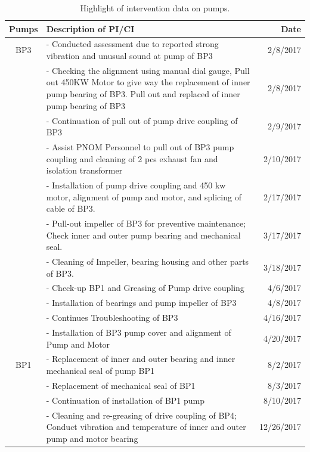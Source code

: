\begin{table}[h]
	\caption{Highlight of intervention data on pumps.}
	\label{interventiondata}
	{\footnotesize
		\begin{tabular}{c|p{8cm}|r}
			\hline
			Pumps & Description of PI/CI & Date \\ 
\hline
BP3 & - Conducted assessment due to reported strong vibration and unusual sound at pump of BP3 & 2/8/2017 \\ 
& - Checking the alignment using manual dial gauge, Pull out 450KW Motor to give way the replacement of inner pump bearing of BP3. Pull out and replaced of inner pump bearing of BP3 & 2/8/2017 \\ 
& - Continuation of pull out of pump drive coupling of BP3 & 2/9/2017 \\ 
& - Assist PNOM Personnel to pull out of BP3 pump coupling and cleaning of 2 pcs exhaust fan and isolation transformer & 2/10/2017 \\ 
& - Installation of pump drive coupling and 450 kw motor, alignment of pump and motor, and splicing of cable of BP3. & 2/17/2017 \\ 
& - Pull-out impeller of BP3 for preventive maintenance; Check inner and outer pump bearing and mechanical seal. & 3/17/2017 \\ 
& - Cleaning of Impeller, bearing housing and other parts of BP3. & 3/18/2017 \\ 
& - Check-up BP1 and Greasing of Pump drive coupling & 4/6/2017 \\ 
& - Installation of bearings and pump impeller of BP3 & 4/8/2017 \\ 
& - Continues Troubleshooting of BP3 & 4/16/2017 \\ 
& - Installation of BP3 pump cover and alignment of Pump and Motor & 4/20/2017 \\ 
\hline
BP1 & - Replacement of inner and outer bearing and inner mechanical seal of pump BP1 & 8/2/2017 \\ 
& - Replacement of mechanical seal of BP1 & 8/3/2017 \\ 
& - Continuation of installation of BP1 pump & 8/10/2017 \\ 
& - Cleaning and re-greasing of drive coupling of BP4; Conduct vibration and temperature of inner and outer pump and motor bearing & 12/26/2017 \\ 
\hline

		\end{tabular}
		
	}
\end{table}


